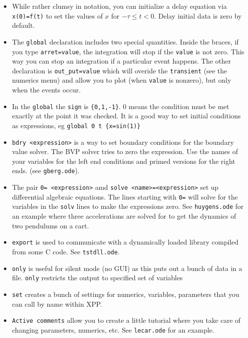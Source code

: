 \begin{itemize}
\item While rather clumsy in notation, you can initialize a delay equation via {\tt x(0)=f(t)} to set the values of $x$ for $-\tau\le t<0.$ Delay initial data is zero by default.  
\item The {\tt global} declaration includes two special quantities. Inside the braces, if you type {\tt arret=value}, the integration will stop if the {\tt value} is not zero. This way you can stop an integration if a particular event happens. The other declaration is {\tt out\_put=value} which will overide the {\tt transient} (see the numerics menu)  and allow you to plot (when {\tt value} is nonzero), but only when the events occur.  
\item In the {\tt global} the {\tt sign} is {\tt \{0,1,-1\}}. 0 means the condition must be met exactly at the point it was checked. It is a good way to set initial conditions as expressions, eg {\tt global 0 t \{x=sin(1)\} }
\item {\tt bdry <expression>} is a way to set boundary conditions for the boundary value solver. The BVP solver tries to zero the expression. Use the names of your variables for the left end conditions and primed versions for the right ends. (see {\tt gberg.ode}). 
\item The pair {\tt 0= <expression>} amd {\tt solve <name>=<expression>} set up differential algebraic equations. The lines starting with {\tt 0=} will solve for the variables in the {\tt solv} lines to make the expressions zero. See {\tt huygens.ode} for an example where three accelerations are solved for to get the dynamics of two pendulums on a cart.
\item {\tt export} is used to communicate with a dynamically loaded library compiled from some C code.  See {\tt tstdll.ode}.
\item {\tt only} is useful for silent mode (no GUI) as this puts out a bunch of data in a file. {\tt only} restricts the output to specified set of variables
\item {\tt set} creates a bunch of settings for numerics, variables, parameters that you can call by name within XPP.
\item {\tt Active comments} allow you to create a little tutorial where you take care of changing parameters, numerics, etc. See {\tt lecar.ode} for an example.

\end{itemize}
 
